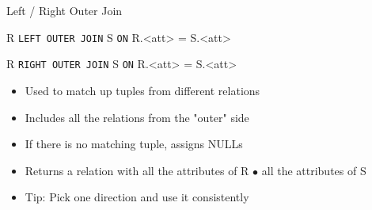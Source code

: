 \documentclass[aspectratio=169]{beamer}
\begin{document}
\begin{frame}{Left / Right Outer Join}

R \texttt{LEFT OUTER JOIN} S \texttt{ON} R.<att> = S.<att>

R \texttt{RIGHT OUTER JOIN} S \texttt{ON} R.<att> = S.<att>

\begin{itemize}
\item Used to match up tuples from different relations
\item Includes all the relations from the "outer" side 
\item If there is no matching tuple, assigns NULLs
\item Returns a relation with all the attributes of R $\bullet$ all the attributes of S
\item Tip: Pick one direction and use it consistently
\end{itemize}

\end{frame}
\end{document}
